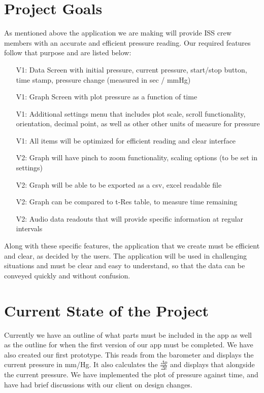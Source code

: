 \documentclass[onecolumn, draftclsnofoot,10pt, compsoc]{IEEEtran}
\begin{document}
\section{Project Goals}
As mentioned above the application we are making will provide ISS crew members with an accurate and efficient pressure reading.
Our required features follow that purpose and are listed below:
\begin{itemize}
\item[V1:] Data Screen with initial pressure, current pressure, start/stop button, time stamp, pressure change (measured in sec / mmHg)
\item[V1:] Graph Screen with plot pressure as a function of time
\item[V1:] Additional settings menu that includes plot scale, scroll functionality, orientation, decimal point, as well as other other units of measure for pressure
\item[V1:] All items will be optimized for efficient reading and clear interface
\item[V2:] Graph will have pinch to zoom functionality, scaling options (to be set in settings)
\item[V2:] Graph will be able to be exported as a csv, excel readable file
\item[V2:] Graph can be compared to t-Res table, to measure time remaining
\item[V2:] Audio data readouts that will provide specific information at regular intervals
\end{itemize}

Along with these specific features, the application that we create must be efficient and clear, as decided by the users.
The application will be used in challenging situations and must be clear and easy to understand, so that the data can be conveyed quickly and without confusion.

\section{Current State of the Project}
Currently we have an outline of what parts must be included in the app as well as the outline for when the first version of our app must be completed.
We have also created our first prototype.
This reads from the barometer and displays the current pressure in mm/Hg. It also calculates the $\frac{\Delta p}{\Delta t}$ and displays that alongside the current pressure.
We have implemented the plot of pressure against time, and have had brief discussions with our client on design changes.
\end{document}
